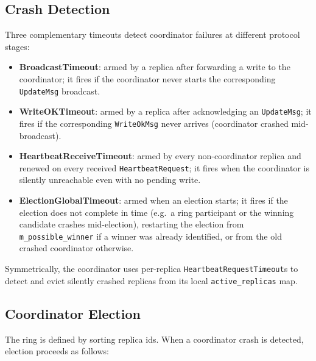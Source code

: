 \subsection{Crash Detection}

Three complementary timeouts detect coordinator failures at different protocol stages:

\begin{itemize}[leftmargin=*]
  \item \textbf{BroadcastTimeout}: armed by a replica after forwarding a write to the coordinator; it
  fires if the coordinator never starts the corresponding \texttt{UpdateMsg} broadcast.
  \item \textbf{WriteOKTimeout}: armed by a replica after acknowledging an \texttt{UpdateMsg}; it
  fires if the corresponding \texttt{WriteOkMsg} never arrives (coordinator crashed mid-broadcast).
  \item \textbf{HeartbeatReceiveTimeout}: armed by every non-coordinator replica and renewed on every
  received \texttt{HeartbeatRequest}; it fires when the coordinator is silently unreachable even with
  no pending write.
  \item 
  \textbf{ElectionGlobalTimeout}: armed when an election starts; it fires if the election does
  not complete in time (e.g.\ a ring participant or the winning candidate crashes mid-election),
  restarting the election from \texttt{m\_possible\_winner} if a winner was already identified, or
  from the old crashed coordinator otherwise.
\end{itemize}

Symmetrically, the coordinator uses per-replica \texttt{HeartbeatRequestTimeout}s to detect and evict
silently crashed replicas from its local \texttt{active\_replicas} map.

\subsection{Coordinator Election}

The ring is defined by sorting replica ids. When a coordinator crash is detected, election proceeds as follows:

